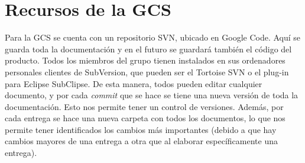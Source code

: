 \documentclass[spanish,a4paper,11pt, twoside]{report}	%
\begin{document}
\part{Recursos de la GCS}
			Para la GCS se cuenta con un repositorio SVN, ubicado en Google Code. Aquí se guarda toda la documentación y en el futuro se guardará también el código del producto.
			Todos los miembros del grupo tienen instalados en sus ordenadores personales clientes de SubVersion, que pueden ser el Tortoise SVN o el plug-in para Eclipse
			SubClipse. De esta manera, todos pueden editar cualquier documento, y por cada \textit{commit} que se hace se tiene una nueva versión de toda la documentación.
			Esto nos permite tener un control de versiones. Además, por cada entrega se hace una nueva carpeta con todos los documentos, lo que nos permite tener
			identificados los cambios más importantes (debido a que hay cambios mayores de una entrega a otra que al elaborar específicamente una entrega).
\newpage
\mbox{}
\thispagestyle{empty}						%
\newpage
\end{document}
